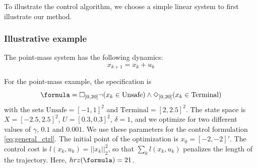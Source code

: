 To illustrate the control algorithm, we choose a simple linear system to first illustrate our method. 

\subsubsection{Illustrative example}
\label{sec:illustrative example}
The point-mass system has the following dynamics:
\begin{equation}
\label{eq:PointMass}
x_{k+1} = x_k + u_k
\end{equation}

For the point-mass example, the specification is 
\[\formula = \always_{[0,20]} \neg (x_k \in \text{Unsafe}) \land \eventually_{[0,20]} (x_k \in \text{Terminal})\]
with the sets $\text{Unsafe}=[-1,1]^2$ and $\text{Terminal}=[2,2.5]^2$. 
The state space is $X=[-2.5,2.5]^2$, $U=[0.3,0.3]^2$, $\delta=1$, and we optimize for two different values of $\gamma$, $0.1$ and $0.001$. We use these parameters for the control formulation \eqref{eq:general_ctrl}.
The initial point of the optimization is $x_0=[-2,-2]'$. 
The control cost is $l(x_k,u_k) = ||x_k||_{2}^2$, so that $\sum_kl(x_k,u_k)$ penalizes the length of the trajectory. Here, $hrz(\formula) = 21$.

